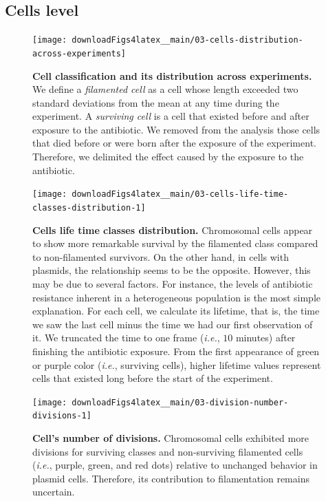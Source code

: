 \documentclass[a4paper, nobind]{templates/ociamthesis}
\begin{document}
\hypertarget{cells-level}{%
\subsection{Cells level}\label{cells-level}}





\begin{figure}[H]
\texttt{[image: downloadFigs4latex\_\_main/03-cells-distribution-across-experiments]} \caption[Cell classification and its distribution across experiments.]{\textbf{Cell classification and its distribution across experiments.} We define a \emph{filamented cell} as a cell whose length exceeded two standard deviations from the mean at any time during the experiment. A \emph{surviving cell} is a cell that existed before and after exposure to the antibiotic. We removed from the analysis those cells that died before or were born after the exposure of the experiment. Therefore, we delimited the effect caused by the exposure to the antibiotic.}\label{fig:03-cells-distribution-across-experiments}
\end{figure}





\begin{figure}[H]
\texttt{[image: downloadFigs4latex\_\_main/03-cells-life-time-classes-distribution-1]} \caption[Cells life time classes distribution.]{\textbf{Cells life time classes distribution.} Chromosomal cells appear to show more remarkable survival by the filamented class compared to non-filamented survivors. On the other hand, in cells with plasmids, the relationship seems to be the opposite. However, this may be due to several factors. For instance, the levels of antibiotic resistance inherent in a heterogeneous population is the most simple explanation. For each cell, we calculate its lifetime, that is, the time we saw the last cell minus the time we had our first observation of it. We truncated the time to one frame (\emph{i.e.}, \(10\) minutes) after finishing the antibiotic exposure. From the first appearance of green or purple color (\emph{i.e.}, surviving cells), higher lifetime values represent cells that existed long before the start of the experiment.}\label{fig:03-cells-life-time-classes-distribution-1}
\end{figure}





\begin{figure}[H]
\texttt{[image: downloadFigs4latex\_\_main/03-division-number-divisions-1]} \caption[Cell's number of divisions.]{\textbf{Cell's number of divisions.} Chromosomal cells exhibited more divisions for surviving classes and non-surviving filamented cells (\emph{i.e.}, purple, green, and red dots) relative to unchanged behavior in plasmid cells. Therefore, its contribution to filamentation remains uncertain.}\label{fig:03-division-number-divisions-1}
\end{figure}
\end{document}
